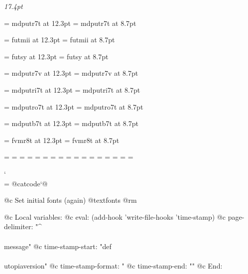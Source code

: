 
\setfont\shortcontrm\rmfontprefix\rmshape{17.4pt}
\setfont\shortcontbf\rmfontprefix\bxshape{17.4pt}
\setfont\shortcontsl\rmfontprefix\slshape{17.4pt}

\setfont\keyrm\rmfontprefix\rmshape{11.6pt}
\setfont\keysy\mtfontprefix\mtsyshape{13.1pt}

\setfont\ordrm\rmfontprefix\rmshape{11pt}
\setfont\fordrm\rmfontprefix\rmshape{9.6pt}

\let\subtitlerm=\textbf
\def\subtitlefont{\subtitlerm \normalbaselineskip = 24pt \normalbaselines}


\font\eightrm=	mdputr7t at 12.3pt
\font\sixrm=	mdputr7t at 8.7pt

\font\eighti=	futmii at 12.3pt
\font\sixi=	futmii at 8.7pt

\font\eightsy=	futsy at 12.3pt
\font\sixsy=	futsy at 8.7pt

\font\eightex=	mdputr7v at 12.3pt
\font\sixex=	mdputr7v at 8.7pt

\font\eightit=	mdputri7t at 12.3pt
\font\sixit=	mdputri7t at 8.7pt

\font\eightsl=	mdputro7t at 12.3pt
\font\sixsl=	mdputro7t at 8.7pt

\font\eightbf=	mdputb7t at 12.3pt
\font\sixbf=	mdputb7t at 8.7pt

\font\eighttt=	fvmr8t at 12.3pt
\font\sixtt=	fvmr8t at 8.7pt

=\eightrm
{}=\sixrm
%
=\eighti
{}=\sixi
%
=\eightsy
{}=\sixsy
%
=\elevenex
{}=\eightex
{}=\sixex
%
\scriptfont\itfam=\eightit
\scriptscriptfont\itfam=\sixit
%
\scriptfont\slfam=\eightsl
\scriptscriptfont\slfam=\sixsl
%
\scriptfont\bffam=\eightbf
\scriptscriptfont\bffam=\sixbf
%
\scriptfont\ttfam=\eighttt
\scriptscriptfont\ttfam=\sixtt


\let\setfont=\setfontorig
\def\setfontorig{\relax}

\catcode`\\=\active
@catcode`@%

@c Set initial fonts (again)
@textfonts
@rm

@c Local variables:
@c eval: (add-hook 'write-file-hooks 'time-stamp)
@c page-delimiter: "^\\\\message"
@c time-stamp-start: "def\\\\utopiaversion{"
@c time-stamp-format: "%
@c time-stamp-end: "}"
@c End:
